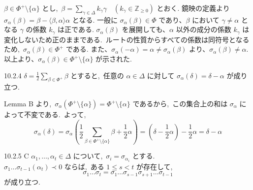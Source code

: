 \documentclass[uplatex,dvipdfmx]{jsarticle}
\begin{document}
\begin{myproof}
    $\beta \in \Phi^+ \setminus \{\alpha\}$ とし,~$\beta = \sum_{\gamma \in \Delta} k_\gamma \gamma \quad (k_\gamma \in \mathbb{Z}_{\ge 0})$ とおく.
    鏡映の定義より $\sigma_\alpha(\beta) = \beta - \langle \beta, \alpha \rangle \alpha$ となる.
    一般に $\sigma_\alpha(\beta) \in \Phi$ であり、$\beta$ において $\gamma \neq \alpha$ となる $\gamma$ の係数 $k_\gamma$ は正である.
    $\sigma_\alpha(\beta)$ を展開しても、$\alpha$ 以外の成分の係数 $k_\gamma$ は変化しないため正のままである.~ルートの性質からすべての係数は同符号となるため,~$\sigma_\alpha(\beta) \in \Phi^+$ である.
    また、$\sigma_\alpha(-\alpha) = \alpha \neq \sigma_\alpha(\beta)$ より、$\sigma_\alpha(\beta) \neq \alpha$.
    以上より、$\sigma_\alpha(\beta) \in \Phi^+ \setminus \{\alpha\}$ が示された.
\end{myproof}
\begin{mycor}{10.2.4}
    $\delta = \frac{1}{2} \sum_{\beta \in \Phi^+} \beta$ とすると,~任意の $\alpha \in \Delta$ に対して $\sigma_\alpha(\delta) = \delta - \alpha$ が成り立つ.
\end{mycor}
\begin{myproof}
    Lemma B より,~$\sigma_\alpha(\Phi^+ \setminus \{\alpha\}) = \Phi^+ \setminus \{\alpha\}$ であるから,~この集合上の和は $\sigma_\alpha$ によって不変である.~よって,
    \begin{equation*}
        \sigma_\alpha(\delta) = \sigma_\alpha\left( \frac{1}{2} \sum_{\beta \in \Phi^+ \setminus \{\alpha\}} \beta + \frac{1}{2} \alpha \right) = \left( \delta - \frac{1}{2}\alpha \right) - \frac{1}{2}\alpha = \delta - \alpha
    \end{equation*}
\end{myproof}
\begin{mylemma}{10.2.5 C}
    $\alpha_1, \dots, \alpha_t \in \Delta$ について,~$\sigma_i = \sigma_{\alpha_i}$ とする.\\
    $\sigma_1 \dots \sigma_{t-1}(\alpha_t) \prec 0$ ならば,~ある $1 \le s < t$ が存在して,~
    \begin{equation*}
        \sigma_1 \dots \sigma_t = \sigma_1 \dots \sigma_{s-1} \sigma_{s+1} \dots \sigma_{t-1}
    \end{equation*}
    が成り立つ.
\end{mylemma}
\end{document}
